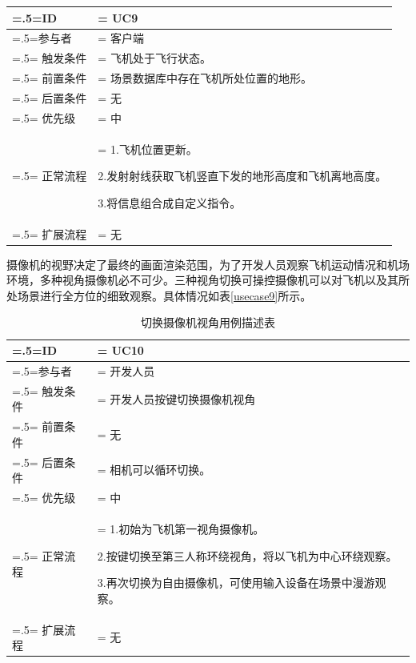 {\begin{table}[htbp]
\begin{center}
\begin{tabularx}{0.8\textwidth}{ 
            | >{\centering\arraybackslash\hsize=.5\hsize\linewidth=\hsize}X 
            | >{\raggedright\arraybackslash\hsize=1.5\hsize\linewidth=\hsize}X 
            | }
            \hline
            \textbf{ID} & \textbf{UC9}\\
            \hline
            参与者 & 客户端\\
            \hline
            触发条件 & 飞机处于飞行状态。\\
            \hline
            前置条件 & 场景数据库中存在飞机所处位置的地形。\\
            \hline
            后置条件 & 无\\
            \hline
            优先级 & 中\\
            \hline
            正常流程 & 1.飞机位置更新。\par 2.发射射线获取飞机竖直下发的地形高度和飞机离地高度。\par 3.将信息组合成自定义指令。\\
            \hline
            扩展流程 & 无\\
            \hline
        \end{tabularx}
    \end{center}
\end{table}

\par
摄像机的视野决定了最终的画面渲染范围，为了开发人员观察飞机运动情况和机场环境，多种视角摄像机必不可少。三种视角切换可操控摄像机可以对飞机以及其所处场景进行全方位的细致观察。具体情况如表\ref{usecase9}所示。
\begin{table}[htbp]
    \begin{center}
        \caption{切换摄像机视角用例描述表}
        \label{usecase10}
        \renewcommand\arraystretch{1.5}
        \begin{tabularx}{0.8\textwidth}{ 
            | >{\centering\arraybackslash\hsize=.5\hsize\linewidth=\hsize}X 
            | >{\raggedright\arraybackslash\hsize=1.5\hsize\linewidth=\hsize}X 
            | }
            \hline
            \textbf{ID} & \textbf{UC10}\\
            \hline
            参与者 & 开发人员\\
            \hline
            触发条件 & 开发人员按键切换摄像机视角\\
            \hline
            前置条件 & 无\\
            \hline
            后置条件 & 相机可以循环切换。\\
            \hline
            优先级 & 中\\
            \hline
            正常流程 & 1.初始为飞机第一视角摄像机。\par 2.按键切换至第三人称环绕视角，将以飞机为中心环绕观察。\par 3.再次切换为自由摄像机，可使用输入设备在场景中漫游观察。\\
            \hline
            扩展流程 & 无\\
            \hline
        \end{tabularx}
    \end{center}
\end{table}
}

